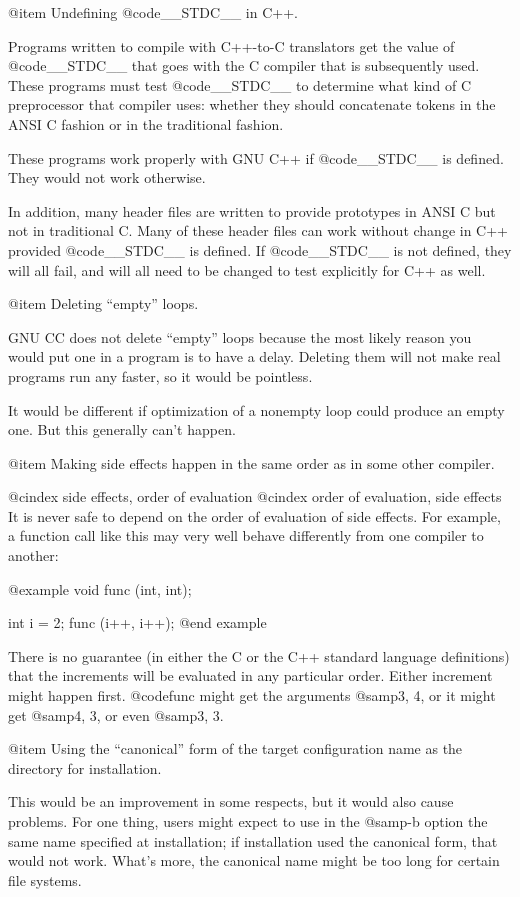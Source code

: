 @item
Undefining @code{__STDC__} in C++.

Programs written to compile with C++-to-C translators get the
value of @code{__STDC__} that goes with the C compiler that is
subsequently used.  These programs must test @code{__STDC__}
to determine what kind of C preprocessor that compiler uses:
whether they should concatenate tokens in the ANSI C fashion
or in the traditional fashion.

These programs work properly with GNU C++ if @code{__STDC__} is defined.
They would not work otherwise.

In addition, many header files are written to provide prototypes in ANSI
C but not in traditional C.  Many of these header files can work without
change in C++ provided @code{__STDC__} is defined.  If @code{__STDC__}
is not defined, they will all fail, and will all need to be changed to
test explicitly for C++ as well.

@item
Deleting ``empty'' loops.

GNU CC does not delete ``empty'' loops because the most likely reason
you would put one in a program is to have a delay.  Deleting them will
not make real programs run any faster, so it would be pointless.

It would be different if optimization of a nonempty loop could produce
an empty one.  But this generally can't happen.

@item
Making side effects happen in the same order as in some other compiler.

@cindex side effects, order of evaluation
@cindex order of evaluation, side effects
It is never safe to depend on the order of evaluation of side effects.
For example, a function call like this may very well behave differently
from one compiler to another:

@example
void func (int, int);

int i = 2;
func (i++, i++);
@end example

There is no guarantee (in either the C or the C++ standard language
definitions) that the increments will be evaluated in any particular
order.  Either increment might happen first.  @code{func} might get the
arguments @samp{3, 4}, or it might get @samp{4, 3}, or even @samp{3, 3}.

@item
Using the ``canonical'' form of the target configuration name as the
directory for installation.

This would be an improvement in some respects, but it would also cause
problems.  For one thing, users might expect to use in the @samp{-b}
option the same name specified at installation; if installation used the
canonical form, that would not work.  What's more, the canonical name
might be too long for certain file systems.

